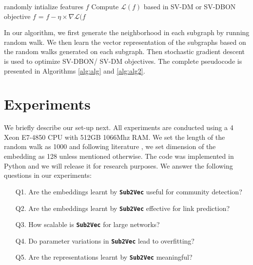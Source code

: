 \documentclass[sigconf]{acmart}
\newcommand{\alg}{{\bf {\tt Sub2Vec}}\xspace}
\begin{document}
\begin{algorithm}
\caption{\alg : StochasticGradientDescent(walkSet, $d$, $w$) }
\label{alg:alg2}
\begin{algorithmic} [1]
\STATE randomly intialize features $f$
 \STATE Compute $\mathcal{L}(f)$ based in SV-DM or SV-DBON objective
\STATE $f$ = $f - \eta \times \nabla \mathcal{L}(f$
\ENDFOR
\ENDFOR
\end{algorithmic}
\end{algorithm}

In our algorithm, we first generate the neighborhood in each subgraph by running random walk. We then
learn the vector representation of the subgraphs based on the random walks generated on each subgraph. Then stochastic gradient descent is used to optimize SV-DBON/ SV-DM objectives. The complete pseudocode is presented in Algorithms  \ref{alg:alg} and \ref{alg:alg2}.


\section{Experiments}
\label{sec:experiments}
We briefly describe our set-up next. All experiments are conducted  using
a 4 Xeon E7-4850 CPU with 512GB 1066Mhz RAM. We set the length of the random walk as 1000 and following literature \cite{grover2016node2vec}, we set dimension of the embedding as 128 unless mentioned otherwise. The code was implemented in Python and we will release it for research purposes. 
We answer the following questions in our experiments: 
\begin{enumerate}[wide, labelwidth=!, labelindent=0pt, itemsep=0pt,nolistsep]
\item[Q1.] Are the embeddings learnt by \alg useful for community detection? 
\item[Q2.] Are the embeddings learnt by \alg effective for link prediction?
\item[Q3.] How scalable is \alg for large networks? 
\item[Q4.] Do parameter variations in \alg lead to overfitting? 
\item[Q5.] Are the representations learnt by \alg  meaningful?
\end{enumerate}
\end{document}
